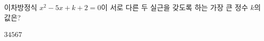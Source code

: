 이차방정식 $x^2-5x+k+2=0$이 서로 다른 두 실근을 갖도록 하는 가장 큰 정수 $k$의 값은?
\begin{choices32}{$3$}{$4$}{$5$}{$6$}{$7$}\end{choices32}
